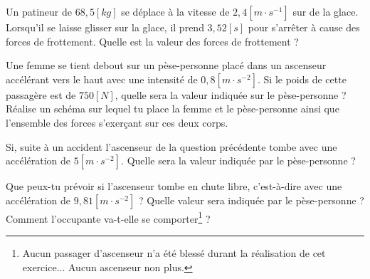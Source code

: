 \begin{exercise}
    Un patineur de \(68,5[kg]\) se déplace à la vitesse de \(2,4[m \cdot s^{-1}]\) sur de la glace. Lorsqu'il se laisse glisser sur la glace, il prend \(3,52[s]\) pour s'arrêter à cause des forces de frottement. Quelle est la valeur des forces de frottement ?
\end{exercise}

\begin{exercise}
    Une femme se tient debout sur un pèse-personne placé dans un ascenseur accélérant vers le haut avec une intensité de \(0,8[m \cdot s^{-2}]\). Si le poids de cette passagère est de \(750[N]\), quelle sera la valeur indiquée sur le pèse-personne ? Réalise un schéma sur lequel tu place la femme et le pèse-personne ainsi que l'ensemble des forces s'exerçant sur ces deux corps.
\end{exercise}

\begin{exercise}
    Si, suite à un accident l'ascenseur de la question précédente tombe avec une accélération de \(5[m \cdot s^{-2}]\). Quelle sera la valeur indiquée par le pèse-personne ?
\end{exercise}

\begin{exercise}
    Que peux-tu prévoir si l'ascenseur tombe en chute libre, c'est-à-dire avec une accélération de \(9,81[m \cdot s^{-2}]\) ? Quelle valeur sera indiquée par le pèse-personne ? Comment l'occupante va-t-elle se comporter\footnote{Aucun passager d'ascenseur n'a été blessé durant la réalisation de cet exercice... Aucun ascenseur non plus.} ?
\end{exercise}